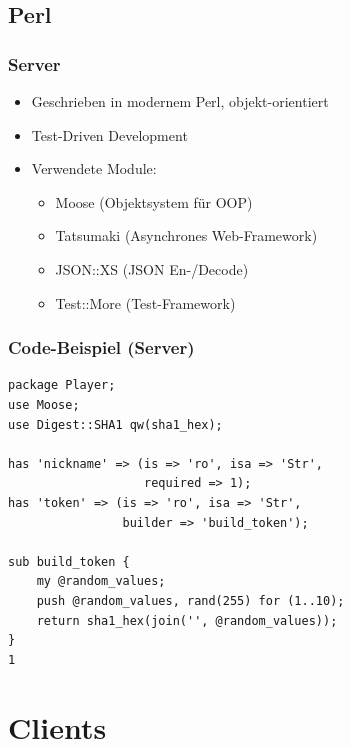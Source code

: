 \documentclass{beamer}
\begin{document}
\subsection{Perl}
\begin{frame}[fragile]
\frametitle{Server}
\begin{itemize}
\item Geschrieben in modernem Perl, objekt-orientiert
\item Test-Driven Development
\item Verwendete Module:
\begin{itemize}
\item Moose (Objektsystem für OOP)
\item Tatsumaki (Asynchrones Web-Framework)
\item JSON::XS (JSON En-/Decode)
\item Test::More (Test-Framework)
\end{itemize}
\end{itemize}
\end{frame}

\begin{frame}[fragile]
\frametitle{Code-Beispiel (Server)}
\begin{lstlisting}
package Player;
use Moose;
use Digest::SHA1 qw(sha1_hex);

has 'nickname' => (is => 'ro', isa => 'Str',
                   required => 1);
has 'token' => (is => 'ro', isa => 'Str',
                builder => 'build_token');

sub build_token {
    my @random_values;
    push @random_values, rand(255) for (1..10);
    return sha1_hex(join('', @random_values));
}
1
\end{lstlisting}
\end{frame}

\section{Clients}
\end{document}
